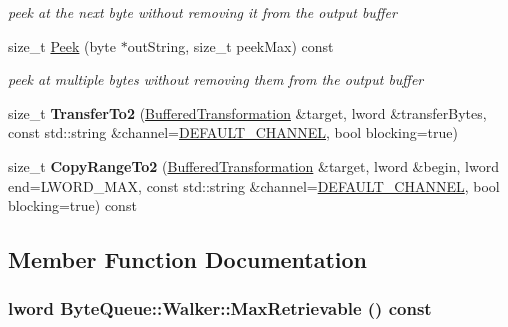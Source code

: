 \begin{DoxyCompactItemize}
\begin{DoxyCompactList}\small\item\em peek at the next byte without removing it from the output buffer \item\end{DoxyCompactList}\item 
\hypertarget{class_byte_queue_1_1_walker_a9f72a866515e0c7a155654d5bd1c427d}{
size\_\-t \hyperlink{class_byte_queue_1_1_walker_a9f72a866515e0c7a155654d5bd1c427d}{Peek} (byte $\ast$outString, size\_\-t peekMax) const }
\label{class_byte_queue_1_1_walker_a9f72a866515e0c7a155654d5bd1c427d}

\begin{DoxyCompactList}\small\item\em peek at multiple bytes without removing them from the output buffer \item\end{DoxyCompactList}\item 
\hypertarget{class_byte_queue_1_1_walker_a47dd1577232b3d6ebd311b5c6d8a1f43}{
size\_\-t {\bfseries TransferTo2} (\hyperlink{class_buffered_transformation}{BufferedTransformation} \&target, lword \&transferBytes, const std::string \&channel=\hyperlink{cryptlib_8h_a6f1917f54ea8c2a45de6e08c5087c8de}{DEFAULT\_\-CHANNEL}, bool blocking=true)}
\label{class_byte_queue_1_1_walker_a47dd1577232b3d6ebd311b5c6d8a1f43}

\item 
\hypertarget{class_byte_queue_1_1_walker_afd93fd488861bc8bc14c4620be327cc1}{
size\_\-t {\bfseries CopyRangeTo2} (\hyperlink{class_buffered_transformation}{BufferedTransformation} \&target, lword \&begin, lword end=LWORD\_\-MAX, const std::string \&channel=\hyperlink{cryptlib_8h_a6f1917f54ea8c2a45de6e08c5087c8de}{DEFAULT\_\-CHANNEL}, bool blocking=true) const }
\label{class_byte_queue_1_1_walker_afd93fd488861bc8bc14c4620be327cc1}

\end{DoxyCompactItemize}


\subsection{Member Function Documentation}
\hypertarget{class_byte_queue_1_1_walker_a3c69dce9261b937f265bae9e8c26479f}{
\subsubsection[{MaxRetrievable}]{\setlength{\rightskip}{0pt plus 5cm}lword ByteQueue::Walker::MaxRetrievable () const}}
\label{class_byte_queue_1_1_walker_a3c69dce9261b937f265bae9e8c26479f}



